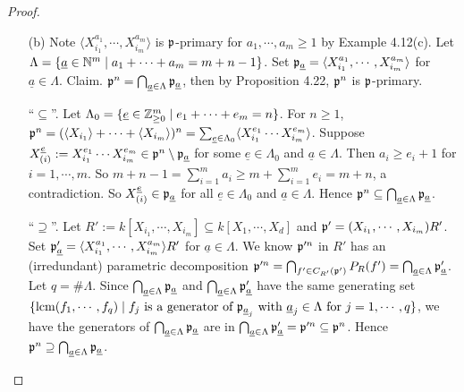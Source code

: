 \begin{proof}
    \begin{enumerate}
        \item[(b)]
            Note $\langle X_{i_1}^{a_1},\cdots,X_{i_m}^{a_m} \rangle$ is $\mathfrak{p}$-primary for $a_1,\cdots,a_m \geq 1$ by Example 4.12(c). Let $\Lambda = \{\underline a \in \mathbb{N}^{m} \mid a_1 + \cdots + a_m = m+n-1\}$. Set $\mathfrak{p}_{\underline a} = \langle X_{i_1}^{a_1},\cdots,X_{i_m}^{a_m} \rangle$ for $\underline a \in \Lambda$. Claim. $\mathfrak{p}^{n} = \bigcap_{\underline a \in \Lambda} \mathfrak{p}_{\underline a}$, then by Proposition 4.22, $\mathfrak{p}^{n}$ is $\mathfrak{p}$-primary. \par
            ``$\subseteq$''. Let $\Lambda_0 = \{\underline e \in \mathbb{Z}_{\geq 0}^{m} \mid e_1 + \cdots + e_m = n\}$. For $n \geq 1$, $\mathfrak{p}^{n} = (\langle X_{i_1} \rangle + \cdots + \langle X_{i_m} \rangle)^{n} = \sum_{\underline e \in \Lambda_0} \langle X_{i_1}^{e_1} \cdots X_{i_m}^{e_m} \rangle$. Suppose $X_{(i)}^{\underline e} := X_{i_1}^{e_1} \cdots X_{i_m}^{e_m} \in \mathfrak{p}^{n} \setminus \mathfrak{p}_{\underline a}$ for some $\underline e \in \Lambda_0$ and $\underline a \in \Lambda$. Then $a_i \geq e_i+1$ for $i = 1,\cdots,m$. So $m+n-1 = \sum_{i=1}^{m}a_i \geq m + \sum_{i=1}^{m}e_i = m+n$, a contradiction. So $X^{\underline e}_{(i)} \in \mathfrak{p}_{\underline a}$ for all $\underline e \in \Lambda_0$ and $\underline a \in \Lambda$. Hence $\mathfrak{p}^{n} \subseteq \bigcap_{\underline a \in \Lambda} \mathfrak{p}_{\underline a}$. \par 
        ``$\supseteq$''. Let $R' := k[X_{i_1},\cdots,X_{i_m}] \subseteq k[X_1,\cdots,X_d]$ and $\mathfrak{p}' = (X_{i_1},\cdots,X_{i_m})R'$. Set $\mathfrak{p}'_{\underline a} = \langle X_{i_1}^{a_1},\cdots,X_{i_m}^{a_m} \rangle R'$ for $\underline a \in \Lambda$. We know $\mathfrak{p}'^{n}$ in $R'$ has an (irredundant) parametric decomposition $\mathfrak{p}'^{n} = \bigcap_{f' \in C_{R'}(\mathfrak{p}')} P_R(f') = \bigcap_{\underline a \in \Lambda} \mathfrak{p}'_{\underline a}$. Let $q = \# \Lambda$. Since $\bigcap_{\underline a \in \Lambda} \mathfrak{p}_{\underline a}$ and $\bigcap_{\underline a \in \Lambda} \mathfrak{p}'_{\underline a}$ have the same generating set $\{\operatorname{lcm}(f_1,\cdots,f_q) \mid f_j \text{ is a generator of $\mathfrak{p}_{\underline a_j}$ with $\underline a_j \in \Lambda$ for $j=1,\cdots,q$}\}$, we have the generators of $\bigcap_{\underline a \in \Lambda} \mathfrak{p}_{\underline a}$ are in $\bigcap_{\underline a \in \Lambda} \mathfrak{p}_{\underline a}' = \mathfrak{p}'^{n} \subseteq \mathfrak{p}^{n}$. Hence $\mathfrak{p}^{n} \supseteq \bigcap_{\underline a \in \Lambda} \mathfrak{p}_{\underline a}$. \qedhere
    \end{enumerate}
\end{proof}

